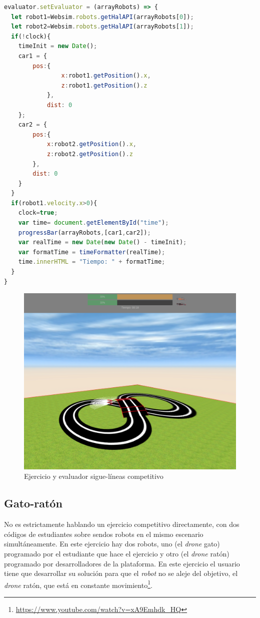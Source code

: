  \begin{lstlisting}[language=javascript,caption=Función que realiza la funcionalidad para rellenar la barra de progreso]
evaluator.setEvaluator = (arrayRobots) => {
  let robot1=Websim.robots.getHalAPI(arrayRobots[0]);
  let robot2=Websim.robots.getHalAPI(arrayRobots[1]);
  if(!clock){
    timeInit = new Date();
    car1 = {
        pos:{
                x:robot1.getPosition().x,
                z:robot1.getPosition().z
            },
            dist: 0
    };
    car2 = {
        pos:{
            x:robot2.getPosition().x,
            z:robot2.getPosition().z
        },
        dist: 0
    }
  }
  if(robot1.velocity.x>0){
    clock=true;
    var time= document.getElementById("time");
    progressBar(arrayRobots,[car1,car2]);
    var realTime = new Date(new Date() - timeInit);
    var formatTime = timeFormatter(realTime);
    time.innerHTML = "Tiempo: " + formatTime;
  }
}
\end{lstlisting}
            
\begin{figure}[H]
    \centering           
    \includegraphics[scale=0.2]{img/evaluator_follow_line.png}
    \caption{Ejercicio y evaluador sigue-líneas competitivo}
    \label{fig:evaluador_siguelineas}
\end{figure}

\subsection{Gato-ratón}
\label{subsec:gatoraton}
No es estrictamente hablando un ejercicio competitivo directamente, con dos códigos de estudiantes sobre sendos robots en el mismo escenario simultáneamente. En este ejercicio hay dos robots, uno (el \textit{drone} gato) programado por el estudiante que hace el ejercicio y otro (el \textit{drone} ratón) programado por desarrolladores de la plataforma. 
En este ejercicio el usuario tiene que desarrollar su solución para que el \textit{robot} no se aleje del objetivo, el \textit{drone} ratón, que está en constante movimiento\footnote{\url{https://www.youtube.com/watch?v=xA9Emhdk_HQ}}. 


